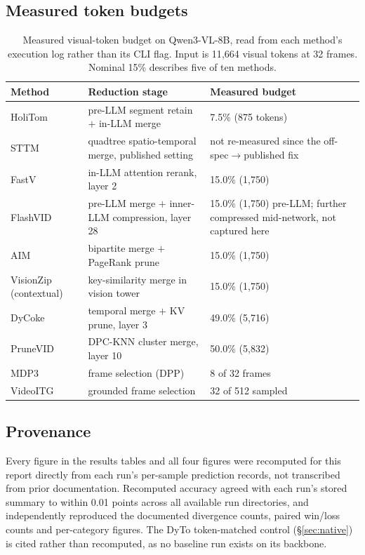 \documentclass[11pt]{article}
\begin{document}
\subsection*{Measured token budgets}
\label{app:budget}

\begin{table}[H]
  \centering
  \small
  \caption{Measured visual-token budget on Qwen3-VL-8B, read from each
  method's execution log rather than its CLI flag. Input is 11{,}664 visual
  tokens at 32 frames. Nominal 15\% describes five of ten methods.}
  \label{tab:budget}
  \begin{tabular}{p{2.2cm}p{6.4cm}p{5.6cm}}
    \toprule
    Method & Reduction stage & Measured budget \\
    \midrule
    HoliTom & pre-LLM segment retain $+$ in-LLM merge & 7.5\% (875 tokens) \\
    STTM & quadtree spatio-temporal merge, published setting & not re-measured since the off-spec$\to$published fix \\
    FastV & in-LLM attention rerank, layer 2 & 15.0\% (1{,}750) \\
    FlashVID & pre-LLM merge $+$ inner-LLM compression, layer 28 & 15.0\% (1{,}750) pre-LLM; further compressed mid-network, not captured here \\
    AIM & bipartite merge $+$ PageRank prune & 15.0\% (1{,}750) \\
    VisionZip (contextual) & key-similarity merge in vision tower & 15.0\% (1{,}750) \\
    DyCoke & temporal merge $+$ KV prune, layer 3 & 49.0\% (5{,}716) \\
    PruneVID & DPC-KNN cluster merge, layer 10 & 50.0\% (5{,}832) \\
    \midrule
    MDP3 & frame selection (DPP) & 8 of 32 frames \\
    VideoITG & grounded frame selection & 32 of 512 sampled \\
    \bottomrule
  \end{tabular}
\end{table}

\subsection*{Provenance}
\label{app:provenance}

Every figure in the results tables and all four figures were recomputed for
this report directly from each run's per-sample prediction records, not
transcribed from prior documentation. Recomputed accuracy agreed with each
run's stored summary to within 0.01 points across all available run
directories, and independently reproduced the documented divergence counts,
paired win/loss counts and per-category figures. The DyTo token-matched
control (\S\ref{sec:native}) is cited rather than recomputed, as no baseline
run exists on its backbone.
\end{document}
